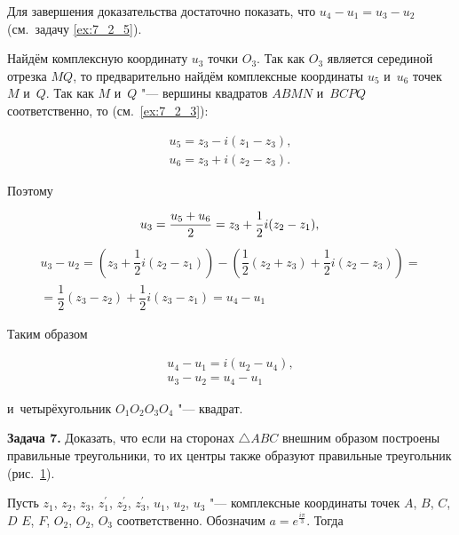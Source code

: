 \noindent
Для завершения доказательства достаточно показать, что
$u_{4} - u_{1} = u_{3} - u_{2}$ (см.\ задачу \ref{ex:7_2_5}).

Найдём комплексную координату $u_{3}$ точки $O_{3}$.
Так как $O_{3}$ является серединой отрезка $MQ$, то предварительно найдём
комплексные координаты $u_{5}$ и~$u_{6}$ точек $M$ и~$Q$. Так как $M$ и~$Q$
"--- вершины квадратов $ABMN$ и~$BCPQ$ соответственно,
то (см.\ \ref{ex:7_2_3}):

\begin{gather*}
u_{5} = z_{3} - i(z_{1} - z_{3}), \\
u_{6} = z_{3} + i(z_{2} - z_{3}).
\end{gather*}

\noindent
Поэтому

\begin{equation*}
u_{3} = \dfrac{u_{5} + u_{6}}{2} = z_{3} + \dfrac{1}{2}i(z_{2} - z_{1}),\\
\end{equation*}
\begin{multline*}
	u_{3} - u_{2} = \left( z_{3} + \dfrac{1}{2}i(z_{2} - z_{1}) \right) -
	\left( \dfrac{1}{2}(z_{2} + z_{3}) + \dfrac{1}{2}i(z_{2} - z_{3}) \right) = \\
	= \dfrac{1}{2}(z_{3} - z_{2}) + \dfrac{1}{2}i(z_{3} - z_{1}) = u_{4} - u_{1}
\end{multline*}

\noindent
Таким образом

\begin{gather*}
u_{4} - u_{1} = i(u_{2} - u_{4}), \\
u_{3} - u_{2} = u_{4} - u_{1}
\end{gather*}

\noindent
и~четырёхугольник $O_{1}O_{2}O_{3}O_{4}$ "--- квадрат.

\textbf{Задача 7.}\label{ex:7_2_7} Доказать, что если на сторонах $\triangle ABC$ внешним
образом построены правильные треугольники, то их центры также образуют
правильные треугольник (рис.\ \ref{fig:7_2_20}).

\begin{figure}\label{fig:7_2_20}
\end{figure}

Пусть $z_{1}$, $z_{2}$, $z_{3}$, $z^\prime_{1}$,
$z^\prime_{2}$, $z^\prime_{3}$, $u_{1}$, $u_{2}$, $u_{3}$ "--- комплексные
координаты точек 
$A$, $B$, $C$, $D$ $E$, $F$, $O_{2}$, $O_{2}$, $O_{3}$ соответственно.
Обозначим $a = e^{\frac{i\pi}{3}}$. Тогда

